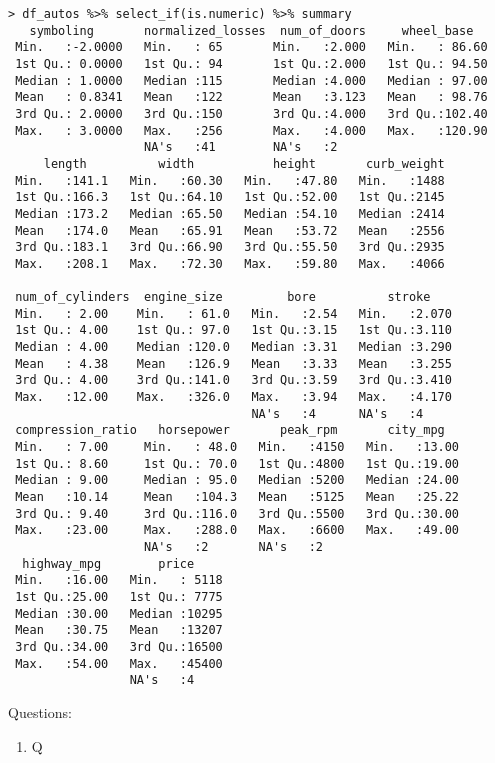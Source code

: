 \documentclass{article}
\begin{document}
\begin{lstlisting}
> df_autos %>% select_if(is.numeric) %>% summary
   symboling       normalized_losses  num_of_doors     wheel_base
 Min.   :-2.0000   Min.   : 65       Min.   :2.000   Min.   : 86.60
 1st Qu.: 0.0000   1st Qu.: 94       1st Qu.:2.000   1st Qu.: 94.50
 Median : 1.0000   Median :115       Median :4.000   Median : 97.00
 Mean   : 0.8341   Mean   :122       Mean   :3.123   Mean   : 98.76
 3rd Qu.: 2.0000   3rd Qu.:150       3rd Qu.:4.000   3rd Qu.:102.40
 Max.   : 3.0000   Max.   :256       Max.   :4.000   Max.   :120.90
                   NA's   :41        NA's   :2
     length          width           height       curb_weight
 Min.   :141.1   Min.   :60.30   Min.   :47.80   Min.   :1488
 1st Qu.:166.3   1st Qu.:64.10   1st Qu.:52.00   1st Qu.:2145
 Median :173.2   Median :65.50   Median :54.10   Median :2414
 Mean   :174.0   Mean   :65.91   Mean   :53.72   Mean   :2556
 3rd Qu.:183.1   3rd Qu.:66.90   3rd Qu.:55.50   3rd Qu.:2935
 Max.   :208.1   Max.   :72.30   Max.   :59.80   Max.   :4066

 num_of_cylinders  engine_size         bore          stroke
 Min.   : 2.00    Min.   : 61.0   Min.   :2.54   Min.   :2.070
 1st Qu.: 4.00    1st Qu.: 97.0   1st Qu.:3.15   1st Qu.:3.110
 Median : 4.00    Median :120.0   Median :3.31   Median :3.290
 Mean   : 4.38    Mean   :126.9   Mean   :3.33   Mean   :3.255
 3rd Qu.: 4.00    3rd Qu.:141.0   3rd Qu.:3.59   3rd Qu.:3.410
 Max.   :12.00    Max.   :326.0   Max.   :3.94   Max.   :4.170
                                  NA's   :4      NA's   :4
 compression_ratio   horsepower       peak_rpm       city_mpg
 Min.   : 7.00     Min.   : 48.0   Min.   :4150   Min.   :13.00
 1st Qu.: 8.60     1st Qu.: 70.0   1st Qu.:4800   1st Qu.:19.00
 Median : 9.00     Median : 95.0   Median :5200   Median :24.00
 Mean   :10.14     Mean   :104.3   Mean   :5125   Mean   :25.22
 3rd Qu.: 9.40     3rd Qu.:116.0   3rd Qu.:5500   3rd Qu.:30.00
 Max.   :23.00     Max.   :288.0   Max.   :6600   Max.   :49.00
                   NA's   :2       NA's   :2
  highway_mpg        price
 Min.   :16.00   Min.   : 5118
 1st Qu.:25.00   1st Qu.: 7775
 Median :30.00   Median :10295
 Mean   :30.75   Mean   :13207
 3rd Qu.:34.00   3rd Qu.:16500
 Max.   :54.00   Max.   :45400
                 NA's   :4
\end{lstlisting}

Questions:
\begin{enumerate}
\item Q
\end{enumerate}

\newpage
\end{document}
